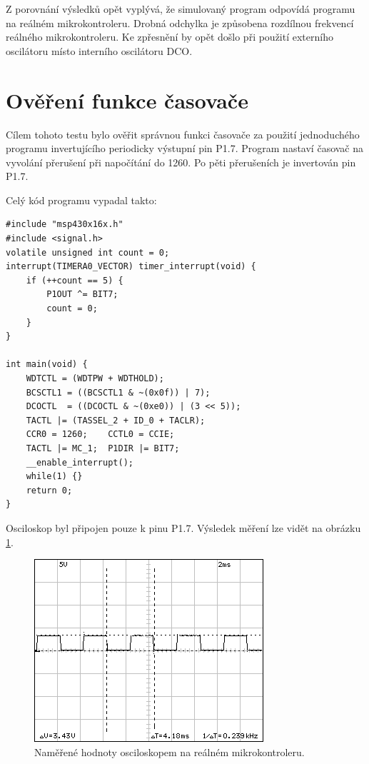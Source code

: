 Z porovnání výsledků opět vyplývá, že simulovaný program odpovídá programu na reálném mikrokontroleru. Drobná odchylka je způsobena rozdílnou frekvencí reálného mikrokontroleru. Ke zpřesnění by opět došlo při použití externího oscilátoru místo interního oscilátoru DCO.

\section{Ověření funkce časovače}
\label{test3}

Cílem tohoto testu bylo ověřit správnou funkci časovače za použití jednoduchého programu invertujícího periodicky výstupní pin P1.7. Program nastaví časovač na vyvolání přerušení při napočítání do 1260. Po pěti přerušeních je invertován pin P1.7.

Celý kód programu vypadal takto:

\lstset{language=XML, numbers=left, frame=single, breaklines=true, tabsize=2, xleftmargin=20pt}
\begin{lstlisting}
#include "msp430x16x.h"
#include <signal.h>
volatile unsigned int count = 0;
interrupt(TIMERA0_VECTOR) timer_interrupt(void) {
	if (++count == 5) {
		P1OUT ^= BIT7;
		count = 0;
	}
}

int main(void) {
	WDTCTL = (WDTPW + WDTHOLD);
	BCSCTL1 = ((BCSCTL1 & ~(0x0f)) | 7);
	DCOCTL  = ((DCOCTL & ~(0xe0)) | (3 << 5));
	TACTL |= (TASSEL_2 + ID_0 + TACLR);
	CCR0 = 1260;	CCTL0 = CCIE;
	TACTL |= MC_1; 	P1DIR |= BIT7;
	__enable_interrupt();
	while(1) {}
	return 0;
}

\end{lstlisting}

Osciloskop byl připojen pouze k pinu P1.7. Výsledek měření lze vidět na obrázku \ref{fig:dso06osc}.

\begin{figure}[ht]
\centering
\includegraphics[trim=0cm 0cm 0cm 0cm]{fig/dso06}
\caption{Naměřené hodnoty osciloskopem na reálném mikrokontroleru.}
\label{fig:dso06osc}
\end{figure}

